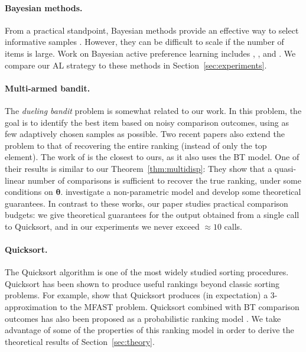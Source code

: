 \paragraph{Bayesian methods.}
From a practical standpoint, Bayesian methods provide an effective way to select informative samples \citep{mackay1992bayesian}.
However, they can be difficult to scale if the number of items is large.
Work on Bayesian active preference learning includes
\citet{chu2005extensions}, \citet{houlsby2012collaborative}, \citet{salimans2012collaborative} and \citet{chen2013pairwise}.
We compare our AL strategy to these methods in Section~\ref{sec:experiments}.

\paragraph{Multi-armed bandit.}
The \emph{dueling bandit} problem \citep{yue2009karmed} is somewhat related to our work.
In this problem, the goal is to identify the best item based on noisy comparison outcomes, using as few adaptively chosen samples as possible.
Two recent papers also extend the problem to that of recovering the entire ranking (instead of only the top element).
The work of \citet{szorenyi2015online} is the closest to ours, as it also uses the BT model.
One of their results is similar to our Theorem~\ref{thm:multidisp}: They show that a quasi-linear number of comparisons is sufficient to recover the true ranking, under some conditions on $\bm{\theta}$.
\citet{heckel2016active} investigate a non-parametric model and develop some theoretical guarantees.
In contrast to these works, our paper studies practical comparison budgets: we give theoretical guarantees for the output obtained from a single call to Quicksort, and in our experiments we never exceed $\approx 10$ calls.

\paragraph{Quicksort.}
The Quicksort algorithm \citep{hoare1962quicksort} is one of the most widely studied sorting procedures.
Quicksort has been shown to produce useful rankings beyond classic sorting problems.
For example, \citet{ailon2008aggregating} show that Quicksort produces (in expectation) a $3$-approximation to the MFAST problem.
Quicksort combined with BT comparison outcomes has also been proposed as a probabilistic ranking model \citep{ailon2008reconciling}.
We take advantage of some of the properties of this ranking model in order to derive the theoretical results of Section~\ref{sec:theory}.
